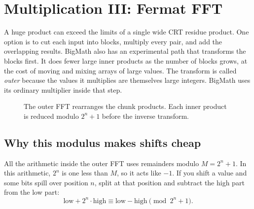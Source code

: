 \chapter{Multiplication III: Fermat FFT}
\label{ch:fermat}

A huge product can exceed the limits of a single wide CRT residue product.
One option is to cut each input into blocks, multiply every pair, and add the
overlapping results. BigMath also has an experimental path that transforms
the blocks first. It does fewer large inner products as the number of blocks
grows, at the cost of moving and mixing arrays of large values. The transform
is called \emph{outer} because the values it multiplies are themselves large
integers. BigMath uses its ordinary multiplier inside that step.

\begin{figure}[H]
\centering
{}
\caption{The outer FFT rearranges the chunk products. Each inner product
is reduced modulo $2^n+1$ before the inverse transform.}
\end{figure}

\section{Why this modulus makes shifts cheap}

All the arithmetic inside the outer FFT uses remainders modulo $M=2^n+1$.
In this arithmetic, $2^n$ is one less than $M$, so it acts like $-1$.
If you shift a value and some bits spill over position $n$, split at
that position and subtract the high part from the low part:
\[
\text{low}+2^n\cdot\text{high}
   \equiv \text{low}-\text{high}\pmod{2^n+1}.
\]

